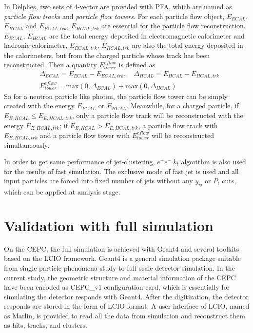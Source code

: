\documentclass[a4paper,10pt,twoside]{cpc-hepnp}
\begin{document}
In Delphes, two sets of 4-vector are provided with PFA, which are named as {\it{particle flow tracks}} and {\it{particle flow towers}}. For each particle flow object, $E_{ECAL}$, $E_{HCAL}$ and $E_{ECAL, trk}$, $E_{HCAL, trk}$ are essential for the particle flow reconstruction. $E_{ECAL}$, $E_{HCAL}$ are the total energy deposited in electromagnetic calorimeter and hadronic calorimeter, $E_{ECAL, trk}$, $E_{HCAL, trk}$ are also the total energy deposited in the calorimeters, but from the charged particle whose track has been reconstructed. Then a quantity $E^{eflow}_{tower}$ is defined as
\begin{eqnarray}
&\Delta_{ECAL}=E_{ECAL}-E_{ECAL, trk}, \quad\Delta_{HCAL}=E_{HCAL}-E_{HCAL, trk}\\
&E^{eflow}_{tower}=\mathrm{max}(0,\Delta_{ECAL})+\mathrm{max}(0,\Delta_{HCAL})
\end{eqnarray}
So for a neutron particle like photon, the particle flow tower can be simply created with the energy $E_{ECAL}$ or $E_{HCAL}$. Meanwhile, for a charged particle,  if $E_{E,HCAL}\le E_{E,HCAL,trk}$, only a particle flow track will be reconstructed with the energy $E_{E,HCAL,trk}$; if $E_{E,HCAL}>E_{E,HCAL,trk}$, a particle flow track with $E_{E,HCAL,trk}$ and a particle flow tower with $E^{eflow}_{tower}$ will be reconstructed simultaneously.

In order to get same performance of jet-clustering, $e^+e^-~k_t$ algorithm is also used for the results of fast simulation. The exclusive mode of fast jet is used and  all input particles are forced into fixed number of jets without any $y_{ij}$ or $P_t$ cuts, which can be applied at analysis stage.  

\section{Validation with full simulation\label{sec:validation}}

\iffalse
On the CEPC, the full simulation is achieved with Geant4 and several toolkits based on the LCIO framework\cite{ref:lcio}. Geant4\cite{ref:geant4} is a general simulation package suitable from single particle phenomena study to full scale detector simulation. In the current study, the geometric structure and material information of the CEPC have been encoded as CEPC\_v1 configuration card, which is essentially for simulating the detector responds with Geant4. After the digitization, the detector responds are stored in the form of LCIO format. A user interface of LCIO, named as Marlin, is provided to read all the data from simulation and reconstruct them as hits, tracks, and clusters.
\end{document}
